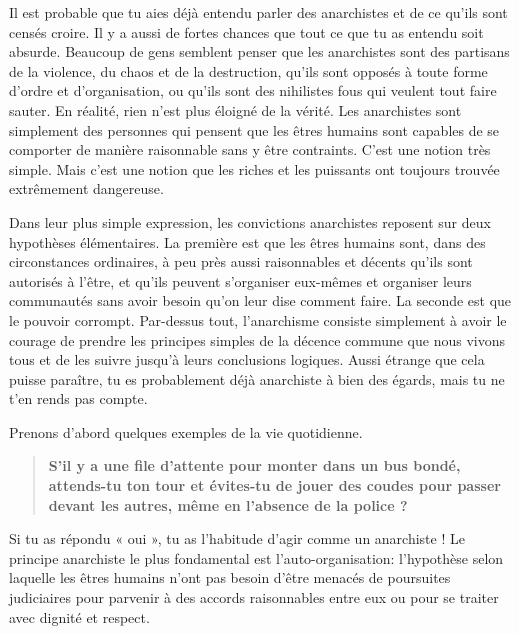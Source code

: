 
Il est probable que tu aies déjà entendu parler des anarchistes et de ce qu'ils sont censés croire. Il y a aussi de fortes chances que tout ce que tu as entendu soit absurde. Beaucoup de gens semblent penser que les anarchistes sont des partisans de la violence, du chaos et de la destruction, qu'ils sont opposés à toute forme d'ordre et d'organisation, ou qu'ils sont des nihilistes fous qui veulent tout faire sauter. En réalité, rien n'est plus éloigné de la vérité. Les anarchistes sont simplement des personnes qui pensent que les êtres humains sont capables de se comporter de manière raisonnable sans y être contraints. C'est une notion très simple. Mais c'est une notion que les riches et les puissants ont toujours trouvée extrêmement dangereuse.

Dans leur plus simple expression, les convictions anarchistes reposent sur deux hypothèses élémentaires. La première est que les êtres humains sont, dans des circonstances ordinaires, à peu près aussi raisonnables et décents qu'ils sont autorisés à l'être, et qu'ils peuvent s'organiser eux-mêmes et organiser leurs communautés sans avoir besoin qu'on leur dise comment faire. La seconde est que le pouvoir corrompt. Par-dessus tout, l'anarchisme consiste simplement à avoir le courage de prendre les principes simples de la décence commune que nous vivons tous et de les suivre jusqu'à leurs conclusions logiques. Aussi étrange que cela puisse paraître, tu es probablement déjà anarchiste à bien des égards, mais tu ne t'en rends pas compte.

Prenons d'abord quelques exemples de la vie quotidienne.

\begin{quotation}
\textbf{S'il y a une file d'attente pour monter dans un bus bondé, attends-tu ton tour et évites-tu de jouer des coudes pour passer devant les autres, même en l'absence de la police ?}
\end{quotation}

Si tu as répondu « oui », tu as l'habitude d'agir comme un anarchiste ! Le principe anarchiste le plus fondamental est l'auto-organisation: l'hypothèse selon laquelle les êtres humains n'ont pas besoin d'être menacés de poursuites judiciaires pour parvenir à des accords raisonnables entre eux ou pour se traiter avec dignité et respect.

